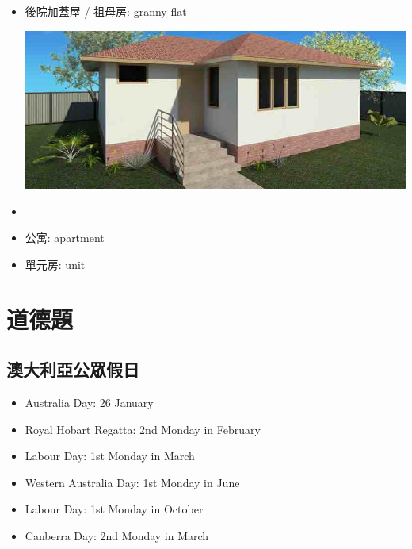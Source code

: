 \begin{multicols}{2}
\begin{itemize}
\begin{center}
  \end{center}
  \item 後院加蓋屋 / 祖母房: granny flat
  \begin{center}
    \includegraphics[scale=0.3]{pics/granny-flat}
  \end{center}
  \item {}
  \item 公寓: apartment
  \item 單元房: unit
\end{itemize}
\end{multicols}

\section{道德題}
\subsection{澳大利亞公眾假日}
\begin{itemize}
  \itemsep0em
  \item Australia Day: 26 January
  \item Royal Hobart Regatta: 2nd Monday in February
  \item Labour Day: 1st Monday in March
  \item Western Australia Day: 1st Monday in June
  \item Labour Day: 1st Monday in October
  \item Canberra Day: 2nd Monday in March
\end{itemize}
